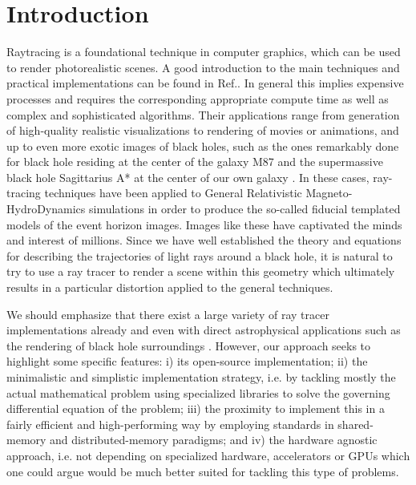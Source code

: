 

\section{Introduction}
\label{sec:intro}


Raytracing is a foundational technique in computer graphics, which can be used
to render photorealistic scenes.
A good introduction to the main techniques and practical implementations can be found
in Ref.\cite{raytracing_in_one_weekend}.
In general this implies expensive processes and requires the corresponding appropriate compute time
as well as complex and sophisticated algorithms.
Their applications \cite{Peddie2019_appns} range from generation of high-quality realistic visualizations to
rendering of movies or animations, and up to even more exotic images of black holes,
such as the ones remarkably done for black hole residing at the center of the galaxy M87 \cite{M87_EHT_i}
and the supermassive black hole Sagittarius A* at the center of our own galaxy \cite{SagA_EHT_i}.
In these cases, ray-tracing techniques have been applied to
General Relativistic Magneto-HydroDynamics simulations in order to produce 
the so-called fiducial templated models of the event horizon images.
Images like these have captivated the minds and interest of millions.
Since we have well established the theory and equations for describing the trajectories of light rays around a black hole, it is natural to try to use a ray tracer to render a scene within this geometry which ultimately results in a particular distortion applied to the general techniques.

We should emphasize that there exist a large variety of ray tracer implementations already 
\cite{imbens2023graphicalprocessinggeodesicpropagation,10.2312/EGPGV/EGPGV12/051-060,7539599_OSPRay}
and even with direct astrophysical applications such as the rendering of black hole surroundings
\cite{10.2312:vmv.20221208,sharma2023mahakalapythonbasedmodularraytracing,James_2015}.
However, our approach seeks to highlight some specific features:
i) its open-source implementation;
ii) the minimalistic and simplistic implementation strategy, i.e. by tackling
mostly the actual mathematical problem using specialized libraries
to solve the governing differential equation of the problem;
iii) the proximity  to implement this in a fairly efficient and high-performing
way by employing standards in shared-memory and distributed-memory paradigms;
and iv) the hardware agnostic approach, i.e. not depending on specialized hardware, accelerators or GPUs \cite{Peddie2019_hardware}
which one could argue would be much better suited for tackling this type of problems.

